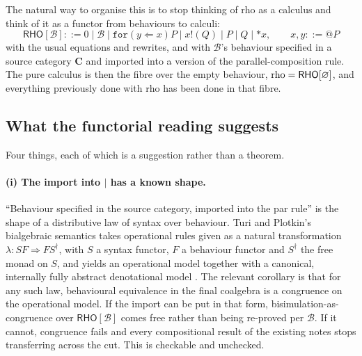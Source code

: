 \documentclass[11pt,a4paper]{article}
\makeatletter
\theoremstyle{definition}
\theoremstyle{plain}
\theoremstyle{remark}
\newcommand{\rc}{\textup{rho}}
\newcommand{\RHO}{\mathsf{RHO}}
\newcommand{\Bee}{\mathcal{B}}
\newcommand{\Cat}{\mathbf{C}}
\newcommand{\quo}[1]{@#1}
\makeatother
\begin{document}
The natural way to organise this is to stop thinking of \rc{} as a calculus and think of
it as a functor from behaviours to calculi:
\[
\RHO[\Bee] ::= 0 \mid \Bee \mid \mathtt{for}(y \Leftarrow x)P \mid x!(Q) \mid P \mid Q
\mid *x, \qquad x, y ::= \quo{P}
\]
with the usual equations and rewrites, and with $\Bee$'s behaviour specified in a source
category $\Cat$ and imported into a version of the parallel-composition rule. The pure
calculus is then the fibre over the empty behaviour, $\rc = \RHO[\varnothing]$, and
everything previously done with \rc{} has been done in that fibre.

\subsection{What the functorial reading suggests}
\label{sec:suggests}

Four things, each of which is a suggestion rather than a theorem.

\paragraph{(i) The import into $\mid$ has a known shape.} ``Behaviour specified in the
source category, imported into the par rule'' is the shape of a distributive law of syntax
over behaviour. Turi and Plotkin's bialgebraic semantics takes operational rules given as a
natural transformation $\lambda : SF \Rightarrow FS^{\dagger}$, with $S$ a syntax functor,
$F$ a behaviour functor and $S^{\dagger}$ the free monad on $S$, and yields an operational
model together with a canonical, internally fully abstract denotational model
\cite{turi1997}. The relevant corollary is that for any such law, behavioural equivalence
in the final coalgebra is a congruence on the operational model. If the import can be put
in that form, bisimulation-as-congruence over $\RHO[\Bee]$ comes free rather than being
re-proved per $\Bee$. If it cannot, congruence fails and every compositional result of the
existing notes stops transferring across the cut. This is checkable and unchecked.
\end{document}
